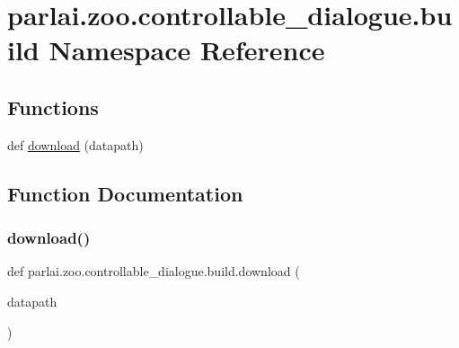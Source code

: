 \hypertarget{namespaceparlai_1_1zoo_1_1controllable__dialogue_1_1build}{}\section{parlai.\+zoo.\+controllable\+\_\+dialogue.\+build Namespace Reference}
\label{namespaceparlai_1_1zoo_1_1controllable__dialogue_1_1build}
\subsection*{Functions}
\begin{DoxyCompactItemize}
\item 
def \hyperlink{namespaceparlai_1_1zoo_1_1controllable__dialogue_1_1build_aa83ad8d48bada73bf7e1c6c5fa4a2f77}{download} (datapath)
\end{DoxyCompactItemize}


\subsection{Function Documentation}
\mbox{\label{namespaceparlai_1_1zoo_1_1controllable__dialogue_1_1build_aa83ad8d48bada73bf7e1c6c5fa4a2f77}} 
\subsubsection{\texorpdfstring{download()}{download()}}
{\footnotesize\ttfamily def parlai.\+zoo.\+controllable\+\_\+dialogue.\+build.\+download (\begin{DoxyParamCaption}\item[{}]{datapath }\end{DoxyParamCaption})}

